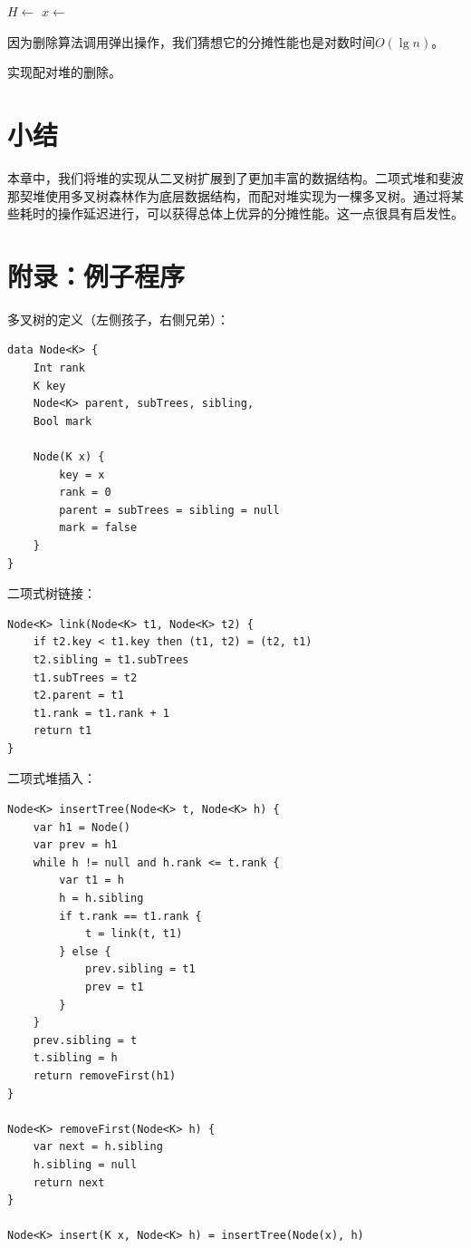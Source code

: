 \documentclass[b5paper]{ctexart}
\begin{document}
\begin{algorithmic}[1]
    \State {}
  \Else
    \State $H \gets$ 
    \State $x \gets$ 
    \State {}
  \EndIf
\EndFunction
\end{algorithmic}

因为删除算法调用弹出操作，我们猜想它的分摊性能也是对数时间$O(\lg n)$。

\begin{Exercise}
实现配对堆的删除。
\end{Exercise}

\section{小结}

本章中，我们将堆的实现从二叉树扩展到了更加丰富的数据结构。二项式堆和斐波那契堆使用多叉树森林作为底层数据结构，而配对堆实现为一棵多叉树。通过将某些耗时的操作延迟进行，可以获得总体上优异的分摊性能。这一点很具有启发性。

\section{附录：例子程序}

多叉树的定义（左侧孩子，右侧兄弟）：

\begin{lstlisting}[language = Bourbaki]
data Node<K> {
    Int rank
    K key
    Node<K> parent, subTrees, sibling,
    Bool mark

    Node(K x) {
        key = x
        rank = 0
        parent = subTrees = sibling = null
        mark = false
    }
}
\end{lstlisting}

二项式树链接：

\begin{lstlisting}[language = Bourbaki]
Node<K> link(Node<K> t1, Node<K> t2) {
    if t2.key < t1.key then (t1, t2) = (t2, t1)
    t2.sibling = t1.subTrees
    t1.subTrees = t2
    t2.parent = t1
    t1.rank = t1.rank + 1
    return t1
}
\end{lstlisting}

二项式堆插入：

\begin{lstlisting}[language = Bourbaki]
Node<K> insertTree(Node<K> t, Node<K> h) {
    var h1 = Node()
    var prev = h1
    while h != null and h.rank <= t.rank {
        var t1 = h
        h = h.sibling
        if t.rank == t1.rank {
            t = link(t, t1)
        } else {
            prev.sibling = t1
            prev = t1
        }
    }
    prev.sibling = t
    t.sibling = h
    return removeFirst(h1)
}

Node<K> removeFirst(Node<K> h) {
    var next = h.sibling
    h.sibling = null
    return next
}

Node<K> insert(K x, Node<K> h) = insertTree(Node(x), h)
\end{lstlisting}
\end{document}

